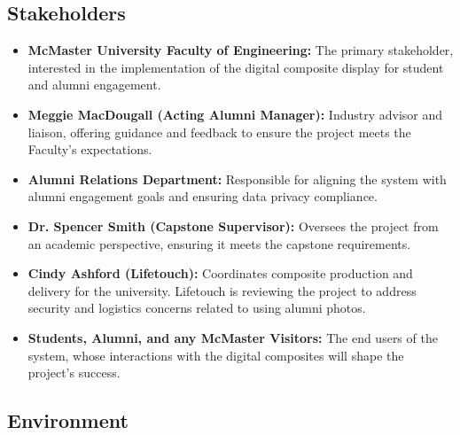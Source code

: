 \documentclass{article}
\begin{document}
\subsection{Stakeholders}
\begin{itemize}
    \item \textbf{McMaster University Faculty of Engineering:}  
    The primary stakeholder, interested in the implementation of the digital composite display for student and alumni engagement.

    \item \textbf{Meggie MacDougall (Acting Alumni Manager):}  
    Industry advisor and liaison, offering guidance and feedback to ensure the project meets the Faculty's expectations.

    \item \textbf{Alumni Relations Department:}  
    Responsible for aligning the system with alumni engagement goals and ensuring data privacy compliance.

    \item \textbf{Dr. Spencer Smith (Capstone Supervisor):}  
    Oversees the project from an academic perspective, ensuring it meets the capstone requirements.

    \item \textbf{Cindy Ashford (Lifetouch):}  
    Coordinates composite production and delivery for the university. Lifetouch is reviewing the project to address security and logistics concerns related to using alumni photos.

    \item \textbf{Students, Alumni, and any McMaster Visitors:}  
    The end users of the system, whose interactions with the digital composites will shape the project's success.

\end{itemize}
\subsection{Environment}

\end{document}
